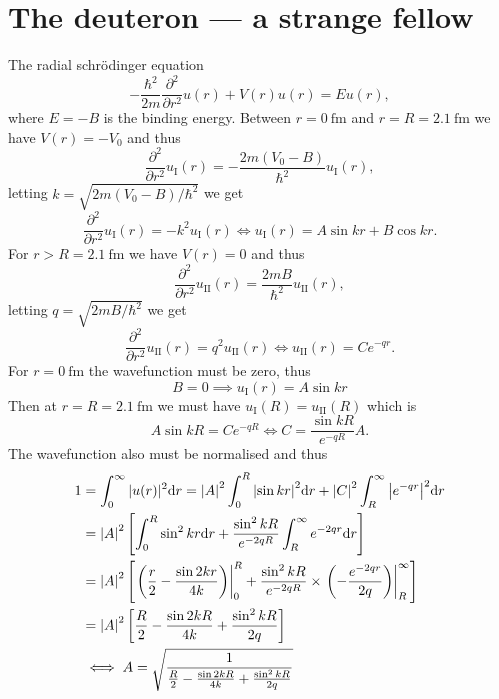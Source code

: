 \section{The deuteron --- a strange fellow}
The radial schrödinger equation
\begin{equation}
	-\frac{\hbar^2}{2 m} \frac{\partial^2}{\partial r^2} u(r) + V(r) u(r) = E u(r),
\end{equation}
where $E = -B$ is the binding energy. Between $r = \SI{0}{\femto\m}$ and $r = R = \SI{2.1}{\femto\m}$ we have $V(r) = -V_0$ and thus
\begin{equation}
	\frac{\partial^2}{\partial r^2} u_\mathrm{I}(r) = -\frac{2m (V_0 - B)}{\hbar^2} u_\mathrm{I}(r),
\end{equation}
letting $k = \sqrt{2m(V_0-B)/\hbar^2}$ we get
\begin{equation}
	\frac{\partial^2}{\partial r^2} u_\mathrm{I}(r) = -k^2 u_\mathrm{I}(r) \iff u_\mathrm{I}(r) = A \sin{kr} + B \cos{kr}.
\end{equation}
For $r > R = \SI{2.1}{\femto\m}$ we have $V(r) = 0$ and thus
\begin{equation}
	\frac{\partial^2}{\partial r^2} u_\mathrm{II}(r) = \frac{2m B}{\hbar^2} u_\mathrm{II}(r),
\end{equation}
letting $q = \sqrt{2mB/\hbar^2}$ we get
\begin{equation}
	\frac{\partial^2}{\partial r^2} u_\mathrm{II}(r) = q^2 u_\mathrm{II}(r) \iff u_\mathrm{II}(r) = C e^{-qr}.
\end{equation}
For $r = \SI{0}{\femto\m}$ the wavefunction must be zero, thus
\begin{equation}
	B = 0 \implies u_\mathrm{I}(r) = A \sin{kr}
\end{equation}
Then at $r = R = \SI{2.1}{\femto\m}$ we must have $u_\mathrm{I}(R) = u_\mathrm{II}(R)$ which is
\begin{equation}
	A \sin{kR} = C e^{-qR} \iff C = \frac{\sin{kR}}{e^{-qR}}A.
\end{equation}
The wavefunction also must be normalised and thus
\begin{align}
	1 &= \int_{0}^{\infty} |u(r)|^2 \dd r = \abs{A}^2\int_{0}^{R} \abs{\sin{kr}}^2  \dd r + \abs{C}^2\int_{R}^{\infty} \abs{e^{-qr}}^2 \dd r \\
	&= \abs{A}^2 \left[   \int_{0}^{R} \sin^2{kr}\dd r + \frac{\sin^2{kR}}{e^{-2qR}} \int_{R}^{\infty} e^{-2qr} \dd r  \right] \\
	&= \abs{A}^2 \left[ \left.\left( \frac{r}{2} - \frac{\sin{2kr}}{4k}  \right)\right|_0^R  + \frac{\sin^2{kR}}{e^{-2qR}} \times \left.\left( -\frac{e^{-2qr}}{2q} \right)\right|_R^\infty  \right]\\
	&= \abs{A}^2 \left[ \frac{R}{2} - \frac{\sin{2kR}}{4k} + \frac{\sin^2{kR}}{2q}\right] \\
	&\iff A = \sqrt{\frac{1}{\frac{R}{2} - \frac{\sin{2kR}}{4k} + \frac{\sin^2{kR}}{2q}}}
\end{align}
